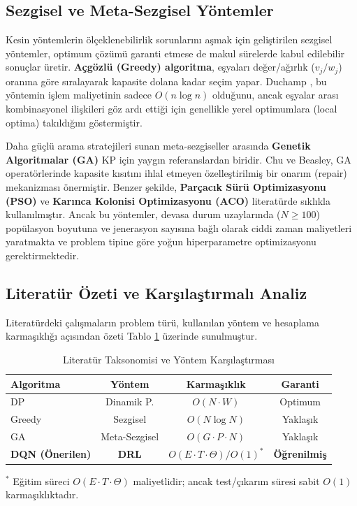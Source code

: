 \documentclass[conference]{IEEEtran}
\begin{document}
\subsection{Sezgisel ve Meta-Sezgisel Yöntemler}
Kesin yöntemlerin ölçeklenebilirlik sorunlarını aşmak için geliştirilen sezgisel yöntemler, optimum çözümü garanti etmese de makul sürelerde kabul edilebilir sonuçlar üretir. \textbf{Açgözlü (Greedy) algoritma}, eşyaları değer/ağırlık ($v_j / w_j$) oranına göre sıralayarak kapasite dolana kadar seçim yapar. Duchamp \cite{duchamp1996}, bu yöntemin işlem maliyetinin sadece $O(n \log n)$ olduğunu, ancak eşyalar arası kombinasyonel ilişkileri göz ardı ettiği için genellikle yerel optimumlara (local optima) takıldığını göstermiştir.

Daha güçlü arama stratejileri sunan meta-sezgiseller arasında \textbf{Genetik Algoritmalar (GA)} \cite{chu1998} KP için yaygın referanslardan biridir. Chu ve Beasley, GA operatörlerinde kapasite kısıtını ihlal etmeyen özelleştirilmiş bir onarım (repair) mekanizması önermiştir. Benzer şekilde, \textbf{Parçacık Sürü Optimizasyonu (PSO)} \cite{hembecker2007} ve \textbf{Karınca Kolonisi Optimizasyonu (ACO)} \cite{leguizamon2009} literatürde sıklıkla kullanılmıştır. Ancak bu yöntemler, devasa durum uzaylarında ($N \geq 100$) popülasyon boyutuna ve jenerasyon sayısına bağlı olarak ciddi zaman maliyetleri yaratmakta ve problem tipine göre yoğun hiperparametre optimizasyonu gerektirmektedir.

\subsection{Literatür Özeti ve Karşılaştırmalı Analiz}
Literatürdeki çalışmaların problem türü, kullanılan yöntem ve hesaplama karmaşıklığı açısından özeti Tablo \ref{tab:taxonomy} üzerinde sunulmuştur.

\begin{table}[htbp]
\caption{Literatür Taksonomisi ve Yöntem Karşılaştırması}
\label{tab:taxonomy}
\centering
\begin{tabular}{|l|c|c|c|}
\hline
\textbf{Algoritma} & \textbf{Yöntem} & \textbf{Karmaşıklık} & \textbf{Garanti} \\ \hline
DP \cite{bellman1957} & Dinamik P. & $O(N \cdot W)$ & Optimum \\ \hline
Greedy \cite{duchamp1996} & Sezgisel & $O(N \log N)$ & Yaklaşık \\ \hline
GA \cite{chu1998} & Meta-Sezgisel & $O(G \cdot P \cdot N)$ & Yaklaşık \\ \hline
\textbf{DQN (Önerilen)} & \textbf{DRL} & \textbf{$O(E \cdot T \cdot \Theta) / O(1)^*$} & \textbf{Öğrenilmiş} \\ \hline
\end{tabular}
\begin{tablenotes}
\small
\item $^*$ Eğitim süreci $O(E \cdot T \cdot \Theta)$ maliyetlidir; ancak test/çıkarım süresi sabit $O(1)$ karmaşıklıktadır.
\end{tablenotes}
\end{table}
\end{document}
